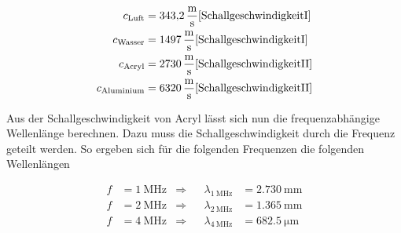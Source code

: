 \begin{align}
    c_\text{Luft}   &= \qty{343,2}{\meter \per \second}    \text{\cite{SchallgeschwindigkeitI}}     \\
    c_\text{Wasser} &= \qty{1497}{\meter \per \second}     \text{\cite{SchallgeschwindigkeitI}}    \\
    c_\text{Acryl}  &= \qty{2730}{\meter \per \second}     \text{\cite{SchallgeschwindigkeitII}}    \\
    c_\text{Aluminium} &= \qty{6320}{\meter \per \second}  \text{\cite{SchallgeschwindigkeitII}}     \\
\end{align}

\noindent Aus der Schallgeschwindigkeit von Acryl lässt sich nun die frequenzabhängige Wellenlänge berechnen. 
Dazu muss die Schallgeschwindigkeit durch die Frequenz geteilt werden. So ergeben sich für die folgenden Frequenzen 
die folgenden Wellenlängen

\begin{align}
    f &= \qty{1}{\mega \hertz} & \Rightarrow& & \lambda_{\qty{1}{\mega \hertz}} &= \qty{2,730}{\milli \meter}   \\
    f &= \qty{2}{\mega \hertz} & \Rightarrow& & \lambda_{\qty{2}{\mega \hertz}} &= \qty{1,365}{\milli \meter}   \\
    f &= \qty{4}{\mega \hertz} & \Rightarrow& & \lambda_{\qty{4}{\mega \hertz}} &= \qty{682,5}{\micro \meter}   \\
\end{align}



%